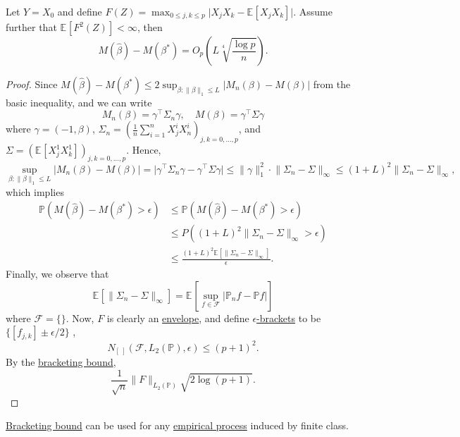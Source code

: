 \begin{theorem}
	Let \(Y = X_0\) and define \(F(Z) = \max _{0 \leq j, k \leq p} \vert X_j X_k - \mathbb{E}_{}\left[X_j X_k \right] \vert \). Assume further that \(\mathbb{E}_{}\left[F^2(Z) \right] < \infty \), then
	\[
		M(\hat{\beta} ) - M(\beta ^{\ast} ) = O_p \left( L \sqrt[4]{\frac{\log p}{n}} \right).
	\]
\end{theorem}
\begin{proof}
	Since \(M(\hat{\beta} ) - M(\beta ^{\ast} ) \leq 2 \sup _{\beta \colon \lVert \beta  \rVert _1 \leq L} \vert M_n(\beta ) - M(\beta ) \vert \) from the basic inequality, and we can write
	\[
		M_n(\beta ) = \gamma ^{\top} \Sigma _n \gamma ,\quad
		M(\beta ) = \gamma ^{\top} \Sigma \gamma
	\]
	where \(\gamma = (-1, \beta )\), \(\Sigma _n = \left( \frac{1}{n} \sum_{i=1}^{n} X_j^i X_n^i \right)_{j, k = 0, \dots , p} \), and \(\Sigma = \left( \mathbb{E}_{}\left[X_j^1 X_k^1 \right] \right) _{j, k = 0, \dots , p} \). Hence,
	\[
		\sup _{\beta \colon \lVert \beta  \rVert _1 \leq L} \vert M_n(\beta ) - M(\beta ) \vert
		= \vert \gamma ^{\top} \Sigma _n \gamma - \gamma ^{\top} \Sigma \gamma  \vert
		\leq \lVert \gamma  \rVert _1^2 \cdot \lVert \Sigma _n - \Sigma  \rVert _\infty
		\leq (1 + L)^2 \lVert \Sigma _n - \Sigma  \rVert _\infty ,
	\]
	which implies
	\[
		\begin{split}
			\mathbb{P} (M(\hat{\beta} ) - M(\beta ^{\ast} ) > \epsilon )
			&\leq \mathbb{P} (M(\hat{\beta} ) - M(\beta ^{\ast} ) > \epsilon )\\
			&\leq P((1 + L)^2 \lVert \Sigma _n - \Sigma  \rVert _\infty > \epsilon )\\
			&\leq \frac{(1 + L)^2 \mathbb{E}_{}\left[\lVert \Sigma _n - \Sigma  \rVert _\infty  \right] }{\epsilon }.
		\end{split}
	\]
	Finally, we observe that
	\[
		\mathbb{E}_{}\left[\lVert \Sigma _n - \Sigma  \rVert _\infty  \right]
		= \mathbb{E}_{}\left[\sup _{f\in \mathscr{F} } \vert \mathbb{P} _n f - \mathbb{P} f \vert  \right]
	\]
	where \(\mathscr{F} = \{  \} \). Now, \(F\) is clearly an \hyperref[def:envelope]{envelope}, and define \hyperref[def:eps-bracket]{\(\epsilon\)-brackets} to be \(\{ [f_{j,k}] \pm \epsilon / 2 \} \) ,
	\[
		N_{[\ ]}(\mathscr{F} , L_2(\mathbb{P} ), \epsilon ) \leq (p + 1) ^2.
	\]
	By the \hyperref[thm:bracketing-bound]{bracketing bound},
	\[
		\frac{1}{\sqrt{n} } \lVert F \rVert _{L_2(\mathbb{P} )} \sqrt{2 \log (p + 1)}.
	\]

\end{proof}

\begin{remark}
	\hyperref[thm:bracketing-bound]{Bracketing bound} can be used for any \hyperref[def:EP]{empirical process} induced by finite class.
\end{remark}